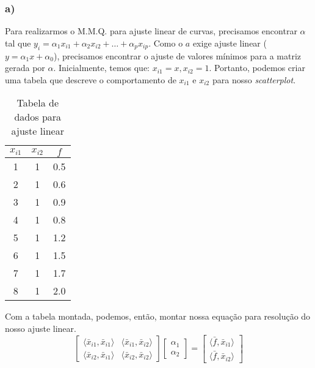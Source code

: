 \documentclass{article}
\begin{document}
\subsubsection*{a)}
\noindent Para realizarmos o M.M.Q. para ajuste linear de curvas, precisamos encontrar $\alpha$ tal que $y_i = \alpha_1x_{i1} + \alpha_2x_{i2} + \dots + \alpha_px_{ip}$.
Como o \(a\) exige ajuste linear ($y = \alpha_1 x + \alpha_0 $), precisamos encontrar o ajuste de valores mínimos para a matriz gerada por $\alpha$.
\hfill\break
\hfill\break
Inicialmente, temos que:
\hfill\break
\hfill\break
$x_{i1} = x, x_{i2} = 1$. Portanto, podemos criar uma tabela que descreve o comportamento de $x_{i1}$ e $x_{i2}$ para nosso \textit{scatterplot}. 
\begin{table}[h!]
    \centering 
    \begin{tabular}{@{}ccc@{}}
    \toprule
    \textbf{$x_{i1}$} & \textbf{$x_{i2}$} & \textbf{$f$} \\ \midrule
    1                 & 1                 & 0.5          \\
    2                 & 1                 & 0.6          \\
    3                 & 1                 & 0.9          \\
    4                 & 1                 & 0.8          \\
    5                 & 1                 & 1.2          \\
    6                 & 1                 & 1.5          \\
    7                 & 1                 & 1.7          \\
    8                 & 1                 & 2.0         
    \end{tabular}
    \caption{Tabela de dados para ajuste linear}
    \label{tab:dados}
\end{table}
\hfill\break
\hfill\break
\hfill\break
\hfill\break
Com a tabela montada, podemos, então, montar nossa equação para resolução do nosso ajuste linear.
\hfill\break
\hfill\break
\[
\begin{bmatrix}
\langle \bar{x}_{i1}, \bar{x}_{i1} \rangle & \langle \bar{x}_{i1}, \bar{x}_{i2} \rangle \\
\langle \bar{x}_{i2}, \bar{x}_{i1} \rangle & \langle \bar{x}_{i2}, \bar{x}_{i2} \rangle 
\end{bmatrix}
\begin{bmatrix}
    \alpha_1 \\
    \alpha_2 
\end{bmatrix}  
=
\begin{bmatrix}
\langle \bar{f}, \bar{x}_{i1} \rangle \\
\langle \bar{f}, \bar{x}_{i2} \rangle 
\end{bmatrix}
\]
\end{document}
